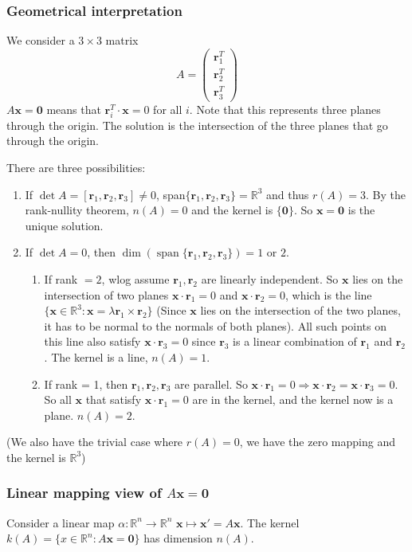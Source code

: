 \documentclass[a4paper]{article}
\theoremstyle{definition}
\newcommand{\mb}[1]{\mathbf{#1}}
\newcommand{\R}{\mathbb{R}}
\DeclareMathOperator\spn{span}
\begin{document}
\subsubsection{Geometrical interpretation}
We consider a $3\times 3$ matrix
\[
A = \begin{pmatrix} \mb{r}_1^T\\\mb{r}_2^T\\\mb{r}_3^T\end{pmatrix}
\]
$A\mb{x} = \mb{0}$ means that $\mb{r}_i^T\cdot \mb{x} = 0$ for all $i$. Note that this represents three planes through the origin. The solution is the intersection of the three planes that go through the origin.

There are three possibilities:
\begin{enumerate}
\item If $\det A =[\mb{r}_1, \mb{r}_2, \mb{r}_3] \not= 0$, span$\{\mb{r}_1, \mb{r}_2, \mb{r}_3\} = \R^3$ and thus $r(A) = 3$. By the rank-nullity theorem, $n(A) = 0$ and the kernel is $\{\mb{0}\}$. So $\mb{x} = \mb{0}$ is the unique solution.
\item If $\det A = 0$, then  $\dim(\spn\{\mb{r}_1, \mb{r}_2, \mb{r}_3\}) = 1$ or $2$.
  \begin{enumerate}
  \item If rank $= 2$, wlog assume $\mb{r}_1, \mb{r}_2$ are linearly independent. So $\mb{x}$ lies on the intersection of two planes $\mb{x}\cdot \mb{r}_1 = 0$ and $\mb{x}\cdot \mb{r}_2 = 0$, which is the line $\{\mb{x}\in \R^3: \mb{x} = \lambda \mb{r}_1\times \mb{r}_2\}$ (Since $\mb{x}$ lies on the intersection of the two planes, it has to be normal to the normals of both planes). All such points on this line also satisfy $\mb{x}\cdot\mb{r}_3 = 0$ since $\mb{r}_3$ is a linear combination of $\mb{r}_1$ and $\mb{r}_2$. The kernel is a line, $n(A) = 1$.
  \item If rank = 1, then $\mb{r}_1, \mb{r}_2, \mb{r}_3$ are parallel. So $\mb{x}\cdot \mb{r}_1 = 0 \Rightarrow \mb{x}\cdot \mb{r}_2 = \mb{x}\cdot \mb{r}_3 = 0$. So all $\mb{x}$ that satisfy $\mb{x}\cdot \mb{r}_1 = 0$ are in the kernel, and the kernel now is a plane. $n(A) = 2$.
  \end{enumerate}
\end{enumerate}
(We also have the trivial case where $r(A) = 0$, we have the zero mapping and the kernel is $\R^3$)

\subsubsection{Linear mapping view of \texorpdfstring{$A\mb{x} = \mb{0}$}{Ax = 0}}
Consider a linear map $\alpha: \R^n \to \R^n$ $\mb{x} \mapsto \mb{x}' = A\mb{x}$. The kernel $k(A) = \{x\in \R^n: A\mb{x} = \mb{0}\}$ has dimension $n(A)$.
\end{document}
